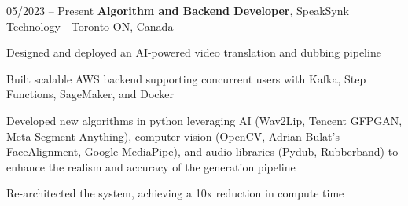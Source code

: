 \begin{twocolentry}{
    05/2023 – Present
}
\fontsize{11 pt}{11 pt}\textbf{Algorithm and Backend Developer}, SpeakSynk Technology - Toronto ON, Canada\end{twocolentry}

\vspace{0.10 cm}
\begin{onecolentry}
    \begin{highlights}
        \item Designed and deployed an AI-powered video translation and dubbing pipeline
        \item Built scalable AWS backend supporting concurrent users with Kafka, Step Functions, SageMaker, and Docker
        \item Developed new algorithms in python leveraging AI (Wav2Lip, Tencent GFPGAN, Meta Segment Anything), computer vision (OpenCV, Adrian Bulat’s FaceAlignment, Google MediaPipe), and audio libraries (Pydub, Rubberband) to enhance the realism and accuracy of the generation pipeline 
        \item Re-architected the system, achieving a 10x reduction in compute time
    \end{highlights}
\end{onecolentry}